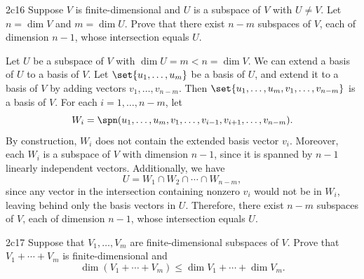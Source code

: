 \begin{exercise}{2c16}
    Suppose $V$ is finite-dimensional and $U$ is a subspace of $V$ with $U \neq V$.
	Let $n = \dim V$ and $m = \dim U$.
	Prove that there exist $n - m$ subspaces of $V$, each of dimension $n - 1$, whose intersection equals $U$.
\end{exercise}

\begin{sol}
    Let $U$ be a subspace of $V$ with $\dim U = m < n = \dim V$.
	We can extend a basis of $U$ to a basis of $V$.
	Let $\set{u_1, \ldots, u_m}$ be a basis of $U$, and extend it to a basis of $V$ by adding vectors $v_1, \ldots, v_{n - m}$.
	Then $\set{u_1, \ldots, u_m, v_1, \ldots, v_{n - m}}$ is a basis of $V$.
	For each $i = 1, \ldots, n - m$, let
    \[
    	W_i = \spn(u_1, \ldots, u_m, v_1, \ldots, v_{i - 1}, v_{i + 1}, \ldots, v_{n - m}).
    \]
    By construction, $W_i$ does not contain the extended basis vector $v_i$.
	Moreover, each $W_i$ is a subspace of $V$ with dimension $n - 1$, since it is spanned by $n - 1$ linearly independent vectors.
	Additionally, we have
    \[
    	U = W_1 \cap W_2 \cap \cdots \cap W_{n - m},
    \]
    since any vector in the intersection containing nonzero $v_i$ would not be in $W_i$, leaving behind only the basis vectors in $U$.
	Therefore, there exist $n - m$ subspaces of $V$, each of dimension $n - 1$, whose intersection equals $U$.
\end{sol}

\begin{exercise}{2c17}
    Suppose that $V_1, \ldots, V_m$ are finite-dimensional subspaces of $V$.
	Prove that $V_1 + \cdots + V_m$ is finite-dimensional and
    \[
    	\dim(V_1 + \cdots + V_m) \leq \dim V_1 + \cdots + \dim V_m.
    \]
\end{exercise}

